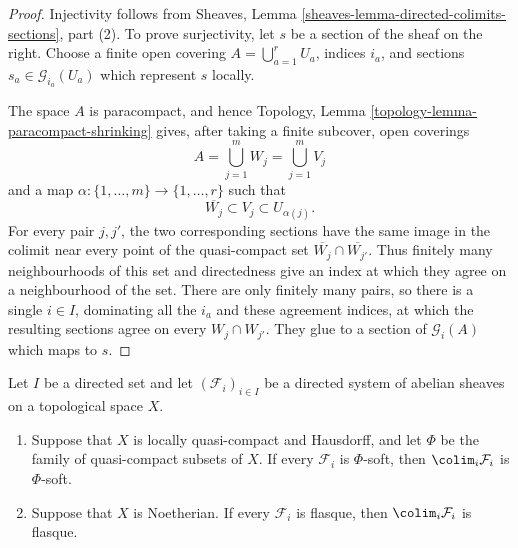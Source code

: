 \begin{proof}
Injectivity follows from Sheaves, Lemma
\ref{sheaves-lemma-directed-colimits-sections}, part (2). To prove
surjectivity, let $s$ be a section of the sheaf on the right. Choose a finite
open covering $A = \bigcup_{a = 1}^r U_a$, indices $i_a$, and sections
$s_a \in \mathcal{G}_{i_a}(U_a)$ which represent $s$ locally.

The space $A$ is paracompact, and hence Topology, Lemma
\ref{topology-lemma-paracompact-shrinking} gives, after taking a finite
subcover, open coverings
$$
A = \bigcup_{j = 1}^m W_j = \bigcup_{j = 1}^m V_j
$$
and a map $\alpha : \{1, \ldots, m\} \to \{1, \ldots, r\}$ such that
$$
\overline{W_j} \subset V_j \subset U_{\alpha(j)}.
$$
For every pair $j,j'$, the two corresponding sections have the same image
in the colimit near every point of the quasi-compact set
$\overline{W_j} \cap \overline{W_{j'}}$. Thus finitely many neighbourhoods
of this set and directedness give an index at which they agree on a
neighbourhood of the set. There are only finitely many pairs, so there is a
single $i \in I$, dominating all the $i_a$ and these agreement indices, at
which the resulting sections agree on every $W_j \cap W_{j'}$. They glue to
a section of $\mathcal{G}_i(A)$ which maps to $s$.
\end{proof}


\begin{lemma}
\label{lemma-colimit-soft-flasque}
\begin{reference}
\cite[Chapter III, \S 3.6, Lemma 3.6.4, p. 170]{Tohoku}
\end{reference}
Let $I$ be a directed set and let $(\mathcal{F}_i)_{i \in I}$ be a
directed system of abelian sheaves on a topological space $X$.
\begin{enumerate}
\item Suppose that $X$ is locally quasi-compact and Hausdorff, and let
$\Phi$ be the family of quasi-compact subsets of $X$. If every
$\mathcal{F}_i$ is $\Phi$-soft, then $\colim_i\mathcal{F}_i$ is
$\Phi$-soft.
\item Suppose that $X$ is Noetherian. If every $\mathcal{F}_i$ is flasque,
then $\colim_i\mathcal{F}_i$ is flasque.
\end{enumerate}
\end{lemma}

